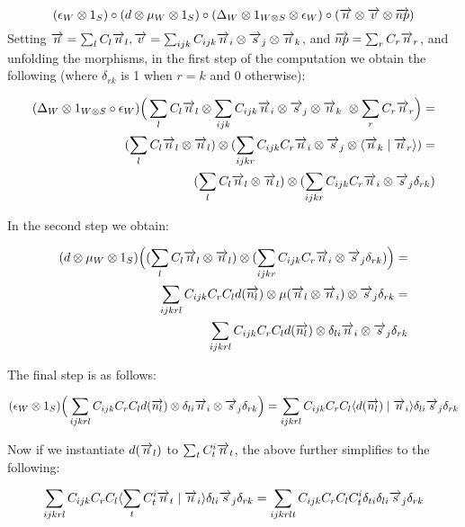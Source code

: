 \[
(\epsilon_W \otimes 1_S) \circ (d \otimes  \mu_W \otimes 1_S) \circ (\Delta_W \otimes 1_{W \otimes S} \otimes \epsilon_W)  \circ (\overrightarrow{{n}} \otimes \overrightarrow{{v}} \otimes \overrightarrow{{np}})
\]
Setting $\overrightarrow{{n}} = \sum_l C_l \overrightarrow{n}_l, \overrightarrow{{v}} = \sum_{ijk} C_{ijk} \overrightarrow{n}_i \otimes \overrightarrow{s}_j \otimes \overrightarrow{n}_k$, and $\overrightarrow{{np}} = \sum_r C_r \overrightarrow{n}_r$, and   unfolding the morphisms, in the first step of the computation we obtain the following (where $\delta_{rk}$ is 1 when $r=k$ and 0 otherwise):

\begin{align*}
(\Delta_W \otimes 1_{W \otimes S} \circ \epsilon_W)\Big(\sum_l C_l \overrightarrow{n}_l \otimes \sum_{ijk} C_{ijk} \overrightarrow{n}_i \otimes \overrightarrow{s}_j \otimes \overrightarrow{n}_k \ \otimes \sum_r C_r \overrightarrow{n}_r \Big) = \\
(\sum_l C_l \overrightarrow{n}_l \otimes \overrightarrow{n}_l) \otimes  (\sum_{ijkr} C_{ijk} C_r \overrightarrow{n}_i \otimes \overrightarrow{s}_j \otimes \langle \overrightarrow{n}_k \mid \overrightarrow{n}_r \rangle)=\\
(\sum_l C_l \overrightarrow{n}_l \otimes \overrightarrow{n}_l) \otimes  (\sum_{ijkr} C_{ijk} C_r \overrightarrow{n}_i \otimes \overrightarrow{s}_j  \delta_{rk})
\end{align*}

\noindent
In the second step we obtain: 

\begin{align*}
(d \otimes  \mu_W \otimes 1_S)\Big((\sum_l C_l \overrightarrow{n}_l \otimes \overrightarrow{n}_l) \otimes  (\sum_{ijkr} C_{ijk} C_r \overrightarrow{n}_i \otimes \overrightarrow{s}_j  \delta_{rk})\Big) =\\ 
\sum_{ijkrl} C_{ijk}  C_r  C_l d(\overrightarrow{n_l}) \otimes \mu(\overrightarrow{n}_l \otimes \overrightarrow{n}_i) \otimes \overrightarrow{s}_j \delta_{rk}=\\
\sum_{ijkrl} C_{ijk}  C_r  C_l d(\overrightarrow{n_l}) \otimes \delta_{li}\overrightarrow{n}_i \otimes \overrightarrow{s}_j \delta_{rk}
\end{align*}

\noindent
The final step is as follows:

\begin{align*}
(\epsilon_{W} \otimes 1_S) \Big( \sum_{ijkrl} C_{ijk}  C_r  C_l d(\overrightarrow{n_l}) \otimes \delta_{li}\overrightarrow{n}_i \otimes \overrightarrow{s}_j \delta_{rk} \Big) =
\sum_{ijkrl} C_{ijk}  C_r  C_l \langle d(\overrightarrow{n_l}) \mid \overrightarrow{n}_i \rangle  \delta_{li} \overrightarrow{s}_j \delta_{rk}
\end{align*}

\noindent Now if we instantiate $d(\overrightarrow{n}_l)$ to $\sum_t C^i_t \overrightarrow{n}_t$, the above further simplifies to the following:
 
 \[
\sum_{ijkrl} C_{ijk}  C_r  C_l \langle \sum_t C^i_t \overrightarrow{n}_t \mid \overrightarrow{n}_i \rangle  \delta_{li} \overrightarrow{s}_j \delta_{rk}=
\sum_{ijkrlt} C_{ijk}  C_r  C_l C^i_t \delta_{ti}  \delta_{li} \overrightarrow{s}_j \delta_{rk}
\]

